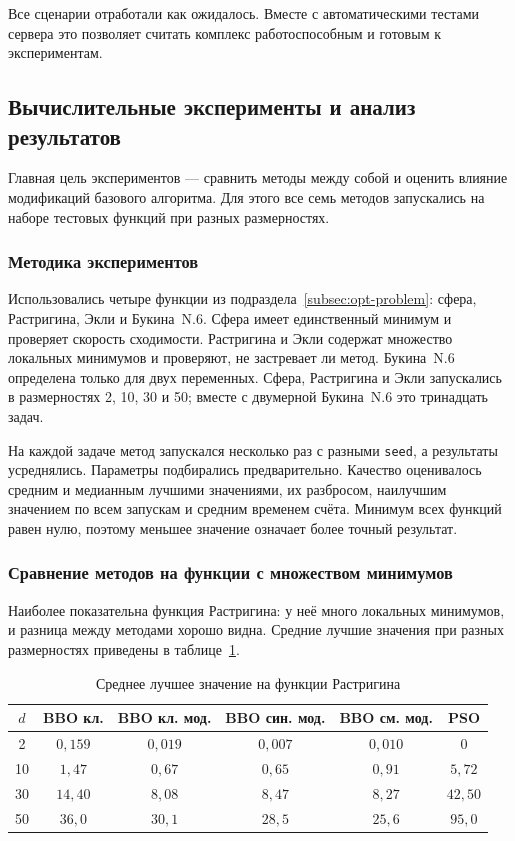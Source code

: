 \documentclass[14pt, a4paper]{extarticle}
\begin{document}
Все сценарии отработали как ожидалось. Вместе с автоматическими тестами сервера это
позволяет считать комплекс работоспособным и готовым к экспериментам.

\subsection{Вычислительные эксперименты и анализ результатов}
\label{subsec:experiments}

Главная цель экспериментов --- сравнить методы между собой и оценить влияние
модификаций базового алгоритма. Для этого все семь методов запускались на наборе
тестовых функций при разных размерностях.

\subsubsection{Методика экспериментов}

Использовались четыре функции из подраздела~\ref{subsec:opt-problem}: сфера,
Растригина, Экли и Букина~N.6. Сфера имеет единственный минимум и проверяет скорость
сходимости. Растригина и Экли содержат множество локальных минимумов и проверяют,
не застревает ли метод. Букина~N.6 определена только для двух переменных. Сфера,
Растригина и Экли запускались в размерностях 2, 10, 30 и 50; вместе с двумерной
Букина~N.6 это тринадцать задач.

На каждой задаче метод запускался несколько раз с разными \texttt{seed}, а
результаты усреднялись. Параметры подбирались предварительно. Качество оценивалось
средним и медианным лучшими значениями, их разбросом, наилучшим значением по всем
запускам и средним временем счёта. Минимум всех функций равен нулю, поэтому меньшее
значение означает более точный результат.

\subsubsection{Сравнение методов на функции с множеством минимумов}

Наиболее показательна функция Растригина: у неё много локальных минимумов, и
разница между методами хорошо видна. Средние лучшие значения при разных
размерностях приведены в таблице~\ref{tab:rastrigin}.

\begin{table}[H]
  \centering
  \caption{Среднее лучшее значение на функции Растригина}
  \label{tab:rastrigin}
  \begin{tabular}{|c|c|c|c|c|c|}
    \hline
    $d$ & BBO кл. & BBO кл. мод. & BBO син. мод. & BBO см. мод. & PSO \\
    \hline
    2  & $0{,}159$ & $0{,}019$ & $0{,}007$ & $0{,}010$ & $0$ \\
    \hline
    10 & $1{,}47$ & $0{,}67$ & $0{,}65$ & $0{,}91$ & $5{,}72$ \\
    \hline
    30 & $14{,}40$ & $8{,}08$ & $8{,}47$ & $8{,}27$ & $42{,}50$ \\
    \hline
    50 & $36{,}0$ & $30{,}1$ & $28{,}5$ & $25{,}6$ & $95{,}0$ \\
    \hline
  \end{tabular}
\end{table}
\end{document}
